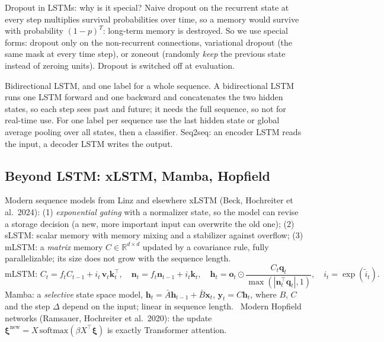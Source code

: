 \begin{qabox}[Hochreiter]{\cexam Dropout in LSTMs: why is it special?}
\ans Naive dropout on the recurrent state at every step multiplies survival probabilities over
time, so a memory would survive with probability $(1-p)^T$: long-term memory is destroyed. So we
use special forms: dropout only on the non-recurrent connections, variational dropout (the same
mask at every time step), or zoneout (randomly \emph{keep} the previous state instead of zeroing
units). Dropout is switched off at evaluation.
\end{qabox}

\begin{qabox}{\asked Bidirectional LSTM, and one label for a whole sequence.}
\ans A bidirectional LSTM runs one LSTM forward and one backward and concatenates the two hidden
states, so each step sees past and future; it needs the full sequence, so not for real-time use.
For one label per sequence use the last hidden state or global average pooling over all states,
then a classifier. Seq2seq: an encoder LSTM reads the input, a decoder LSTM writes the output.
\end{qabox}

\subsection{Beyond LSTM: xLSTM, Mamba, Hopfield}

\begin{summary}{Modern sequence models from Linz and elsewhere}
\textsf{xLSTM} (Beck, Hochreiter et al.\ 2024): (1) \emph{exponential gating} with a normalizer
state, so the model can revise a storage decision (a new, more important input can overwrite the
old one); (2) \textsf{sLSTM}: scalar memory with memory mixing and a stabilizer against overflow;
(3) \textsf{mLSTM}: a \emph{matrix} memory $C\in\mathbb{R}^{d\times d}$ updated by a covariance rule,
fully parallelizable; its size does not grow with the sequence length.
\[
\text{mLSTM: }C_t=f_tC_{t-1}+i_t\,\mathbf{v}_t\mathbf{k}_t^\top,\quad
\mathbf{n}_t=f_t\mathbf{n}_{t-1}+i_t\mathbf{k}_t,\quad
\mathbf{h}_t=\mathbf{o}_t\odot\frac{C_t\mathbf{q}_t}{\max(|\mathbf{n}_t^\top\mathbf{q}_t|,1)},\quad i_t=\exp(\tilde i_t).
\]
\textsf{Mamba}: a \emph{selective} state space model, $\mathbf{h}_t=\bar A\mathbf{h}_{t-1}+\bar B\mathbf{x}_t$,
$\mathbf{y}_t=C\mathbf{h}_t$, where $B$, $C$ and the step $\Delta$ depend on the input; linear in
sequence length. \
\textsf{Modern Hopfield networks} (Ramsauer, Hochreiter et al.\ 2020): the update
$\bm\xi^{\text{new}}=X\,\mathrm{softmax}(\beta X^\top\bm\xi)$ is exactly Transformer attention.
\end{summary}

